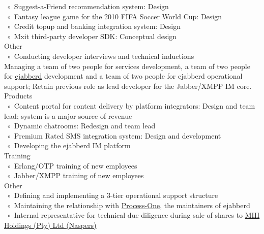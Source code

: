 \documentclass[10pt,a4paper,final]{columncv}
\newcommand{\cvitembullet}{~$\circ$~}
\newcommand{\cvitempbullet}{\phantom{\cvitembullet}}
\begin{document}
\begin{cvenv}
{          \cvitembullet Suggest-a-Friend recommendation system: Design \\
          \cvitembullet Fantasy league game for the 2010 FIFA Soccer World Cup: Design \\
          \cvitembullet Credit topup and banking integration system: Design \\
          \cvitembullet Mxit third-party developer SDK: Conceptual design \\
          Other \\
          \cvitembullet Conducting developer interviews and technical inductions \\}
         {Managing a team of two people for services development, a team of two people for 
          \href{http://www.process-one.net/en/ejabberd/}{ejabberd} development and a team 
          of two people for ejabberd operational support; 
          Retain previous role as lead developer for the Jabber/XMPP IM core.}
          {Products \\
           \cvitembullet Content portal for content delivery by platform integrators: 
           \cvitempbullet Design and team lead; system is a major source of revenue \\ 
           \cvitembullet Dynamic chatrooms: Redesign and team lead \\
           \cvitembullet Premium Rated SMS integration system: Design and development \\
           \cvitembullet Developing the ejabberd IM platform \\
           Training \\
           \cvitembullet Erlang/OTP training of new employees \\
           \cvitembullet Jabber/XMPP training of new employees \\
           Other \\
           \cvitembullet Defining and implementing a 3-tier operational support structure \\
           \cvitembullet Maintaining the relationship with 
                    \href{http://www.process-one.net/en/}{Process-One}, the maintainers  
           \cvitempbullet of ejabberd \\
           \cvitembullet Internal representative for technical due diligence during sale of 
           \cvitempbullet shares to \href{http://www.naspers.com/}{MIH Holdings (Pty) Ltd (Naspers)}}
\end{cvenv}
\end{document}
